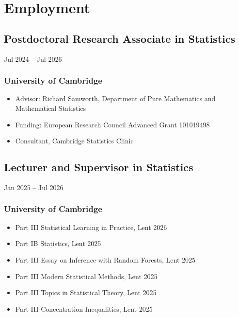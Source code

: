 \documentclass{wgu-cv}
\begin{document}
\maketitle

\section{Employment}

\subsection{Postdoctoral Research Associate in Statistics}
{Jul 2024 -- Jul 2026}
\subsubsection{University of Cambridge}

\begin{itemize}
  \item Advisor: Richard Samworth,
    Department of Pure Mathematics and Mathematical Statistics
  \item Funding: European Research Council Advanced Grant 101019498
  \item Consultant, Cambridge Statistics Clinic
\end{itemize}

\subsection{Lecturer and Supervisor in Statistics}
{Jan 2025 -- Jul 2026}
\subsubsection{University of Cambridge}

\begin{itemize}

  \item
    Part III Statistical Learning in Practice, Lent 2026

  \item
    Part IB Statistics, Lent 2025

  \item
    Part III Essay on Inference with Random Forests, Lent 2025

  \item
    Part III Modern Statistical Methods, Lent 2025

  \item
    Part III Topics in Statistical Theory, Lent 2025

  \item
    Part III Concentration Inequalities, Lent 2025

\end{itemize}
\end{document}
